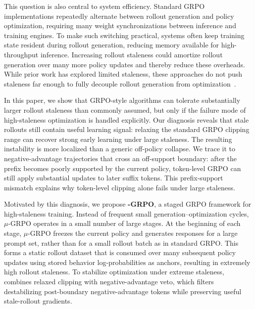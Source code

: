 This question is also central to system efficiency. Standard GRPO implementations repeatedly alternate between rollout generation and policy optimization, requiring many weight synchronizations between inference and training engines. To make such switching practical, systems often keep training state resident during rollout generation, reducing memory available for high-throughput inference\citep{sheng2025hybridflow, slime_github}. Increasing rollout staleness could amortize rollout generation over many more policy updates and thereby reduce these overheads. While prior work has explored limited staleness, these approaches do not push staleness far enough to fully decouple rollout generation from optimization~\cite{zheng2025prosperitycollapsefaroffpolicy,xi2025bapo}.

In this paper, we show that GRPO-style algorithms can tolerate substantially larger rollout staleness than commonly assumed, but only if the failure mode of high-staleness optimization is handled explicitly. Our diagnosis reveals that stale rollouts still contain useful learning signal: relaxing the standard GRPO clipping range can recover strong early learning under large staleness. The resulting instability is more localized than a generic off-policy collapse.  We trace it to negative-advantage trajectories that cross an off-support boundary: after the prefix becomes poorly supported by the current policy, token-level GRPO can still apply substantial updates to later suffix tokens. This prefix-support mismatch explains why token-level clipping alone fails under large staleness.


Motivated by this diagnosis, we propose  \textbf{\boldmath{$\mu$}-GRPO}, a staged GRPO framework for high-staleness training. Instead of frequent small generation–optimization cycles, $\mu$-GRPO operates in a small number of large stages. At the beginning of each stage, $\mu$-GRPO freezes the current policy and generates responses for a large prompt set, rather than for a small rollout batch as in standard GRPO. This forms a static rollout dataset that is consumed over many subsequent policy updates using stored behavior log-probabilities as anchors, resulting in extremely high rollout staleness. To stabilize optimization under extreme staleness, \ourmethod{} combines relaxed clipping with negative-advantage veto, which filters destabilizing post-boundary negative-advantage tokens while preserving useful stale-rollout gradients.


